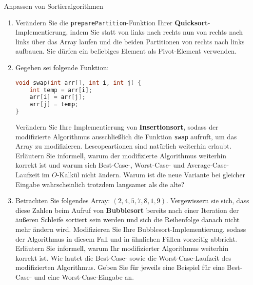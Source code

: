 \documentclass[11pt,a4paper]{article}
\begin{document}
\begin{aufgabe}{2}{Anpassen von Sortieralgorithmen}
    \begin{enumerate}
        \item Verändern Sie die \texttt{preparePartition}-Funktion Ihrer \textbf{Quicksort}-Implementierung, indem Sie statt von links nach rechts nun von rechts nach links über das Array laufen und die beiden Partitionen von rechts nach links aufbauen.
        Sie dürfen ein beliebiges Element als Pivot-Element verwenden.

        \item Gegeben sei folgende Funktion:
        \begin{lstlisting}[language=c++]
void swap(int arr[], int i, int j) {
    int temp = arr[i];
    arr[i] = arr[j];
    arr[j] = temp;
} 
        \end{lstlisting}
        Verändern Sie Ihre Implementierung von \textbf{Insertionsort}, sodass der modifizierte Algorithmus ausschließlich die Funktion \texttt{swap} aufruft, um das Array zu modifizieren. Leseopeartionen sind natürlich weiterhin erlaubt.
        Erläutern Sie informell, warum der modifizierte Algorithmus weiterhin korrekt ist und warum sich Best-Case-, Worst-Case- und Average-Case-Laufzeit im $O$-Kalkül nicht ändern.
        Warum ist die neue Variante bei gleicher Eingabe wahrscheinlich trotzdem langsamer als die alte?

        \item Betrachten Sie folgendes Array: $(2, 4, 5, 7, 8, 1, 9)$. Vergewissern sie sich, dass diese Zahlen beim Aufruf von \textbf{Bubble\-sort} bereits nach einer Iteration der äußeren Schleife sortiert sein werden und sich die Reihenfolge danach nicht mehr ändern wird.
        Modifizieren Sie Ihre Bubblesort-Implementierung, sodass der Algorithmus in diesem Fall und in ähnlichen Fällen vorzeitig abbricht.
        Erläutern Sie informell, warum Ihr modifizierter Algorithmus weiterhin korrekt ist.
        Wie lautet die Best-Case- sowie die Worst-Case-Laufzeit des modifizierten Algorithmus.
        Geben Sie für jeweils eine Beispiel für eine Best-Case- und eine Worst-Case-Eingabe an.
    \end{enumerate}
\end{aufgabe}
\end{document}

